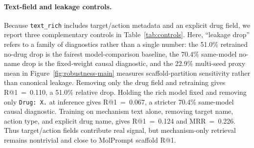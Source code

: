 \documentclass{article}
\begin{document}
\paragraph{Text-field and leakage controls.}
Because \texttt{text\_rich} includes target/action metadata and an explicit drug field, we report three complementary controls in Table~\ref{tab:controls}. Here, ``leakage drop'' refers to a family of diagnostics rather than a single number: the 51.0\% retrained no-drug drop is the fairest model-comparison baseline, the 70.4\% same-model no-name drop is the fixed-weight causal diagnostic, and the 22.9\% multi-seed proxy mean in Figure~\ref{fig:robustness-main} measures scaffold-partition sensitivity rather than canonical leakage. Removing only the drug field and retraining gives R@1~=~0.110, a 51.0\% relative drop. Holding the rich model fixed and removing only \texttt{Drug: X.} at inference gives R@1~=~0.067, a stricter 70.4\% same-model causal diagnostic. Training on mechanism text alone, removing target name, action type, and explicit drug name, gives R@1~=~0.124 and MRR~=~0.226. Thus target/action fields contribute real signal, but mechanism-only retrieval remains nontrivial and close to MolPrompt scaffold R@1.
\end{document}
